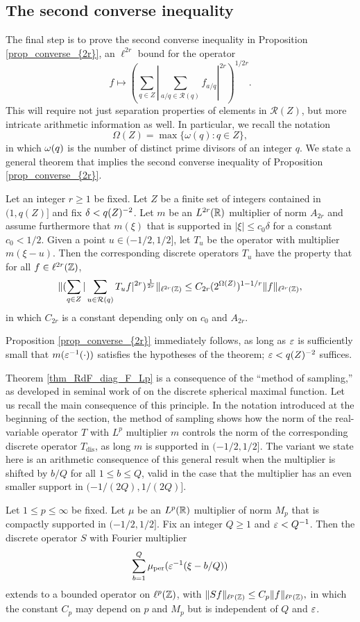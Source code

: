 \documentclass[oneside,11pt]{amsart}
\newcommand{\Rcal}{\mathcal{R}}
\begin{document}
\subsection{The second converse inequality}
The final step  is to prove the second converse inequality in  Proposition \ref{prop_converse_{2r}},  an $\ell^{2r}$ bound for the operator
\[f \mapsto ( \sum_{q \in Z} |\sum_{a/q \in \Rcal(q)} f_{a/q} |^{2r})^{1/2r}.\]
This will require not just separation properties of elements in $\Rcal(Z)$, but more intricate arithmetic information as well.
In particular, we recall the notation
\[ \Omega(Z) = \max \{ \omega(q) : q \in Z\},\]
in which $\omega(q)$  is the number of distinct prime divisors of an integer $q$.
We state a general theorem that implies the second converse inequality of  Proposition \ref{prop_converse_{2r}}.
\begin{thm}\label{thm_RdF_diag_F_Lp}
 Let an integer $r \geq 1$ be fixed. Let $Z$ be a finite set of integers contained in $ (1, q(Z)]$ and fix $\delta <  q(Z)^{-2}$.  Let $m$ be an $L^{2r}(\mathbb{R})$ multiplier of norm $A_{2r}$ and assume furthermore that $m(\xi)$ that is supported in $|\xi| \leq c_0 \delta$ for a constant $c_0 <1/2$.    Given a point $u \in (-1/2,1/2]$, let $T_{u}$ be the operator with multiplier $m(\xi - u)$. Then the corresponding discrete operators $T_u$ have the property that for all $f \in \ell^{2r}(\mathbb{Z})$,
\[
  \|(\sum_{q \in Z}  | \sum_{u \in \Rcal(q)} T_{u} f |^{2r})^{\frac{1}{2r}}\|_{\ell^{2r}(\Z)}
	\leq C_{2r}(2^{\Omega(Z)})^{1 - 1/r} \| f\|_{\ell^{2r}(\Z)},
\]
in which $C_{2r}$ is a constant depending only on $c_0$ and $A_{2r}$.
\end{thm}
 Proposition \ref{prop_converse_{2r}} immediately follows, as long as  $\varepsilon$  is sufficiently small that $m(\varepsilon^{-1}(\cdot))$ satisfies the hypotheses of the theorem;   $\varepsilon<  q(Z)^{-2}$ suffices. 
 

Theorem \ref{thm_RdF_diag_F_Lp} is a consequence of the ``method of sampling,'' as developed in seminal work of  \cite[\S 2]{MSW} on the discrete spherical maximal function. Let us recall the main consequence of this principle.
 In the notation introduced at the beginning of the section, the method of sampling shows how the norm of the real-variable operator $T$ with $L^p$ multiplier $m$ controls the norm of the corresponding discrete operator $T_{\mathrm{dis}}$, as long $m$ is supported in $(-1/2,1/2]$. The variant we state here is an arithmetic consequence of this general result when the multiplier is shifted by $b/Q$ for all $1 \leq b \leq Q$, valid in the case that the multiplier has an even smaller support in $(-1/(2Q),1/(2Q)]$. 
\begin{thm}\label{thm_maxlp_same_denom}
Let $1 \leq p  \leq \infty$ be fixed. Let $\mu$ be an $L^p(\mathbb{R})$ multiplier of norm $M_p$ that is   compactly supported in $(-1/2,1/2]$.
Fix an integer $Q \geq 1$ and $\varepsilon< Q^{-1}$.
Then the discrete operator $S$ with Fourier multiplier 
\[ \sum_{b=1}^Q \mu_{\mathrm{per}}(\varepsilon^{-1}(\xi - b/Q)) \]
extends to a bounded operator on $\ell^p(\mathbb{Z})$, with 
$ \| S  f\|_{\ell^p(\mathbb{Z})} \leq C_p \| f \|_{\ell^p(\mathbb{Z})},
$
in which the constant $C_p$ may depend on $p$ and  $M_p$    but is independent of $Q$ and $\varepsilon$. 
\end{thm}
 
\end{document}
